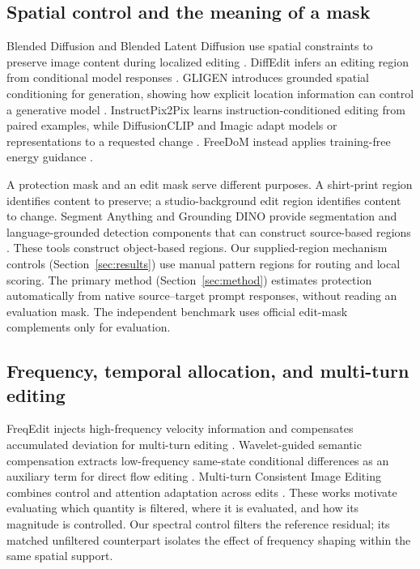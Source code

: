 \subsection{Spatial control and the meaning of a mask}
Blended Diffusion and Blended Latent Diffusion use spatial constraints to preserve image content during localized editing \cite{avrahami2022blended,avrahami2023blendedlatent}. DiffEdit infers an editing region from conditional model responses \cite{couairon2023diffedit}. GLIGEN introduces grounded spatial conditioning for generation, showing how explicit location information can control a generative model \cite{li2023gligen}. InstructPix2Pix learns instruction-conditioned editing from paired examples, while DiffusionCLIP and Imagic adapt models or representations to a requested change \cite{brooks2023instructpix2pix,kim2022diffusionclip,kawar2023imagic}. FreeDoM instead applies training-free energy guidance \cite{yu2023freedom}.

A protection mask and an edit mask serve different purposes. A shirt-print region identifies content to preserve; a studio-background edit region identifies content to change. Segment Anything and Grounding DINO provide segmentation and language-grounded detection components that can construct source-based regions \cite{kirillov2023sam,liu2024groundingdino}. These tools construct object-based regions. Our supplied-region mechanism controls (Section~\ref{sec:results}) use manual pattern regions for routing and local scoring. The primary method (Section~\ref{sec:method}) estimates protection automatically from native source--target prompt responses, without reading an evaluation mask. The independent benchmark uses official edit-mask complements only for evaluation.

\subsection{Frequency, temporal allocation, and multi-turn editing}
FreqEdit injects high-frequency velocity information and compensates accumulated deviation for multi-turn editing \cite{liao2025freqedit}. Wavelet-guided semantic compensation extracts low-frequency same-state conditional differences as an auxiliary term for direct flow editing \cite{tang2026wavelet}. Multi-turn Consistent Image Editing combines control and attention adaptation across edits \cite{zhou2025multiturn}. These works motivate evaluating which quantity is filtered, where it is evaluated, and how its magnitude is controlled. Our spectral control filters the reference residual; its matched unfiltered counterpart isolates the effect of frequency shaping within the same spatial support.

